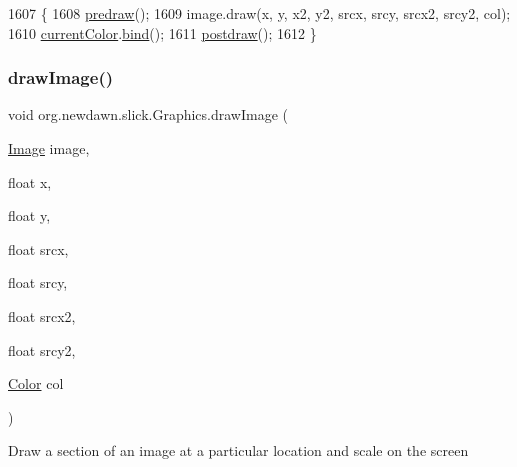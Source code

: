 \begin{DoxyCode}
1607                                                                          \{
1608         \mbox{\hyperlink{classorg_1_1newdawn_1_1slick_1_1_graphics_a7b4c203181e3b6302d51ed9b24596b8d}{predraw}}();
1609         image.draw(x, y, x2, y2, srcx, srcy, srcx2, srcy2, col);
1610         \mbox{\hyperlink{classorg_1_1newdawn_1_1slick_1_1_graphics_add4b542e574390a735aad66468135d5a}{currentColor}}.\mbox{\hyperlink{classorg_1_1newdawn_1_1slick_1_1_color_ae4b71c94854f7983f2ccdb7340438e23}{bind}}();
1611         \mbox{\hyperlink{classorg_1_1newdawn_1_1slick_1_1_graphics_abe054371d1486618ff327bbbcf02ff97}{postdraw}}();
1612     \}
\end{DoxyCode}
\mbox{\label{classorg_1_1newdawn_1_1slick_1_1_graphics_a2c233df85a05a57a34775de4357f9875}} 
\subsubsection{\texorpdfstring{draw\+Image()}{drawImage()}\hspace{0.1cm}{\footnotesize\ttfamily [6/6]}}
{\footnotesize\ttfamily void org.\+newdawn.\+slick.\+Graphics.\+draw\+Image (\begin{DoxyParamCaption}\item[{\mbox{\hyperlink{classorg_1_1newdawn_1_1slick_1_1_image}{Image}}}]{image,  }\item[{float}]{x,  }\item[{float}]{y,  }\item[{float}]{srcx,  }\item[{float}]{srcy,  }\item[{float}]{srcx2,  }\item[{float}]{srcy2,  }\item[{\mbox{\hyperlink{classorg_1_1newdawn_1_1slick_1_1_color}{Color}}}]{col }\end{DoxyParamCaption})\hspace{0.3cm}{\ttfamily [inline]}}

Draw a section of an image at a particular location and scale on the screen


